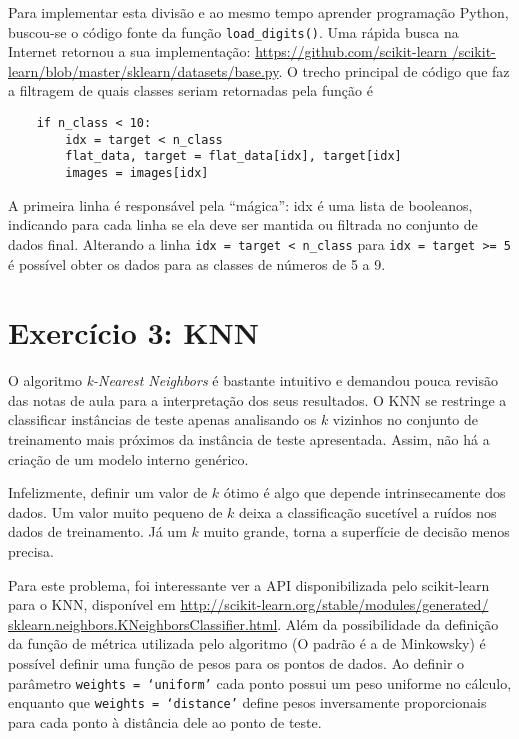 \documentclass[brazil]{article}
\begin{document}
Para implementar esta divisão e ao mesmo tempo aprender programação Python,
buscou-se o código fonte da função \texttt{load\_digits()}. Uma rápida busca na
Internet retornou a sua implementação: \url{https://github.com/scikit-learn
/scikit-learn/blob/master/sklearn/datasets/base.py}. O trecho principal de
código que faz a filtragem de quais classes seriam retornadas pela função é

\begin{verbatim}
    if n_class < 10:
        idx = target < n_class
        flat_data, target = flat_data[idx], target[idx]
        images = images[idx]
\end{verbatim}

A primeira linha é responsável pela ``mágica'': idx é uma lista de booleanos,
indicando para cada linha se ela deve ser mantida ou filtrada no conjunto de
dados final. Alterando a linha \texttt{idx = target < n\_class} para
\texttt{idx = target >= 5} é possível obter os dados para as classes de números
de 5 a 9.

\section{Exercício 3: KNN}

O algoritmo \emph{k-Nearest Neighbors} é bastante intuitivo e demandou pouca
revisão das notas de aula para a interpretação dos seus resultados. O KNN se
restringe a classificar instâncias de teste apenas analisando os $k$ vizinhos no
conjunto de treinamento mais próximos da instância de teste apresentada. Assim,
não há a criação de um modelo interno genérico.

Infelizmente, definir um valor de $k$ ótimo é algo que depende intrinsecamente
dos dados. Um valor muito pequeno de $k$ deixa a classificação sucetível a
ruídos nos dados de treinamento. Já um $k$ muito grande, torna a superfície de
decisão menos precisa.

Para este problema, foi interessante ver a API disponibilizada pelo scikit-learn
para o KNN, disponível em \url{http://scikit-learn.org/stable/modules/generated/
sklearn.neighbors.KNeighborsClassifier.html}. Além da possibilidade da definição
da função de métrica utilizada pelo algoritmo (O padrão é a de Minkowsky) é
possível definir uma função de pesos para os pontos de dados. Ao definir o
parâmetro \texttt{weights = `uniform'} cada ponto possui um peso uniforme no
cálculo, enquanto que \texttt{weights = `distance'} define pesos inversamente
proporcionais para cada ponto à distância dele ao ponto de teste.
\end{document}
